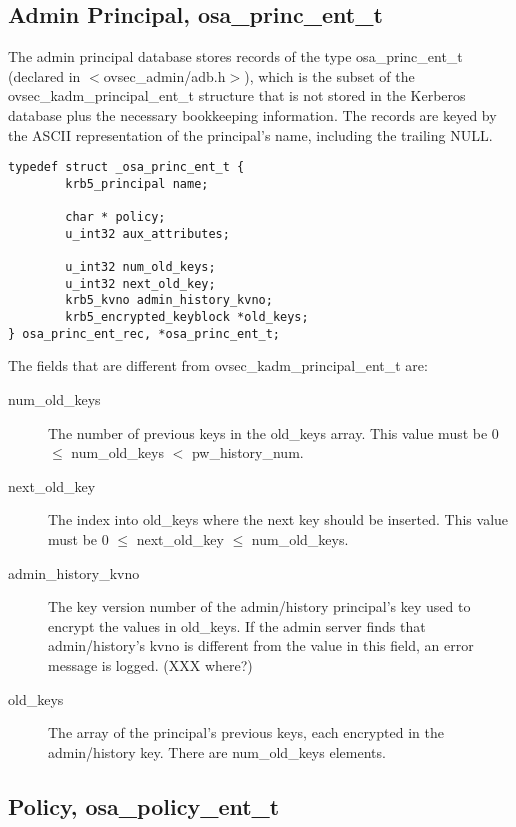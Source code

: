 \subsection{Admin Principal, osa_princ_ent_t}

The admin principal database stores records of the type
osa_princ_ent_t (declared in $<$ovsec_admin/adb.h$>$), which is the
subset of the ovsec_kadm_principal_ent_t structure that is not stored
in the Kerberos database plus the necessary bookkeeping information.
The records are keyed by the ASCII representation of the principal's
name, including the trailing NULL.

\begin{verbatim}
typedef struct _osa_princ_ent_t {
        krb5_principal name;

        char * policy;
        u_int32 aux_attributes;

        u_int32 num_old_keys;
        u_int32 next_old_key;
        krb5_kvno admin_history_kvno;
        krb5_encrypted_keyblock *old_keys;
} osa_princ_ent_rec, *osa_princ_ent_t;
\end{verbatim}

The fields that are different from ovsec_kadm_principal_ent_t are:

\begin{description}
\item[num_old_keys] The number of previous keys in the old_keys array.
This value must be 0 $\le$ num_old_keys $<$ pw_history_num.

\item[next_old_key] The index into old_keys where the next key should
be inserted.  This value must be 0 $\le$ next_old_key $\le$
num_old_keys.

\item[admin_history_kvno] The key version number of the admin/history
principal's key used to encrypt the values in old_keys.  If the admin
server finds that admin/history's kvno is different from the value in
this field, an error message is logged.  (XXX where?)

\item[old_keys] The array of the principal's previous keys, each
encrypted in the admin/history key.  There are num_old_keys elements.
\end{description}

\subsection{Policy, osa_policy_ent_t}

